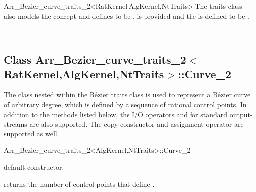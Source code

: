 \begin{ccRefClass}{Arr_Bezier_curve_traits_2<RatKernel,AlgKernel,NtTraits>}
The traits-class also models the  concept
and defines  to
be .
 is provided and the 
is defined to be .


\ccIsModel
   \\

\ccTypes



\subsection*{Class
         Arr\_Bezier\_curve\_traits\_2$<$RatKernel,AlgKernel,NtTraits$>$::Curve\_2}

The  class nested within the B\'ezier traits class is used
to represent a B\'ezier curve of arbitrary degree, which is defined by a
sequence of rational control points. In addition to the methods listed
below, the I/O operators  and  for
standard output-streams are also supported. The copy constructor and
assignment operator are supported as well.

\begin{ccClass}{Arr_Bezier_curve_traits_2<AlgKernel,NtTraits>::Curve_2}
% 
\ccCreation
{}

  {default constructor.}


\ccAccessFunctions

  {returns the number of control points that define \ccVar.}


\end{ccClass}
\end{ccRefClass}
